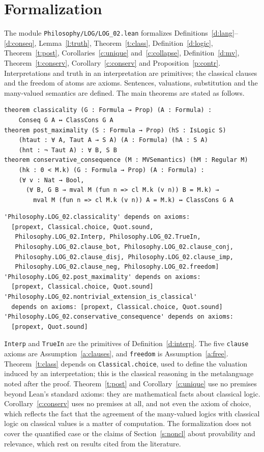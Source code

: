 \documentclass{situationist-preprint}
\begin{document}
\section{Formalization}\label{s:formal}

The module \nolinkurl{Philosophy/LOG/LOG_02.lean} formalizes Definitions~\ref{d:lang}--\ref{d:conseq}, Lemma~\ref{l:truth}, Theorem~\ref{t:class}, Definition~\ref{d:logic}, Theorem~\ref{t:post}, Corollaries~\ref{c:unique} and~\ref{c:collapse}, Definition~\ref{d:mv}, Theorem~\ref{t:conserv}, Corollary~\ref{c:conserv} and Proposition~\ref{p:contr}. Interpretations and truth in an interpretation are primitives; the classical clauses and the freedom of atoms are axioms. Sentences, valuations, substitution and the many-valued semantics are defined. The main theorems are stated as follows.

\begin{lstlisting}
theorem classicality (G : Formula → Prop) (A : Formula) :
    Conseq G A ↔ ClassCons G A
theorem post_maximality (S : Formula → Prop) (hS : IsLogic S)
    (htaut : ∀ A, Taut A → S A) (A : Formula) (hA : S A)
    (hnt : ¬ Taut A) : ∀ B, S B
theorem conservative_consequence (M : MVSemantics) (hM : Regular M)
    (hk : 0 < M.k) (G : Formula → Prop) (A : Formula) :
    (∀ v : Nat → Bool,
      (∀ B, G B → mval M (fun n => cl M.k (v n)) B = M.k) →
        mval M (fun n => cl M.k (v n)) A = M.k) ↔ ClassCons G A
\end{lstlisting}

\begin{lstlisting}
'Philosophy.LOG_02.classicality' depends on axioms:
  [propext, Classical.choice, Quot.sound,
   Philosophy.LOG_02.Interp, Philosophy.LOG_02.TrueIn,
   Philosophy.LOG_02.clause_bot, Philosophy.LOG_02.clause_conj,
   Philosophy.LOG_02.clause_disj, Philosophy.LOG_02.clause_imp,
   Philosophy.LOG_02.clause_neg, Philosophy.LOG_02.freedom]
'Philosophy.LOG_02.post_maximality' depends on axioms:
  [propext, Classical.choice, Quot.sound]
'Philosophy.LOG_02.nontrivial_extension_is_classical'
  depends on axioms: [propext, Classical.choice, Quot.sound]
'Philosophy.LOG_02.conservative_consequence' depends on axioms:
  [propext, Quot.sound]
\end{lstlisting}

\texttt{Interp} and \texttt{TrueIn} are the primitives of Definition~\ref{d:interp}. The five \texttt{clause} axioms are Assumption~\ref{a:clauses}, and \texttt{freedom} is Assumption~\ref{a:free}. Theorem~\ref{t:class} depends on \texttt{Classical.choice}, used to define the valuation induced by an interpretation; this is the classical reasoning in the metalanguage noted after the proof. Theorem~\ref{t:post} and Corollary~\ref{c:unique} use no premises beyond Lean's standard axioms: they are mathematical facts about classical logic. Corollary~\ref{c:conserv} uses no premises at all, and not even the axiom of choice, which reflects the fact that the agreement of the many-valued logics with classical logic on classical values is a matter of computation. The formalization does not cover the quantified case or the claims of Section~\ref{s:noncl} about provability and relevance, which rest on results cited from the literature.
\end{document}
